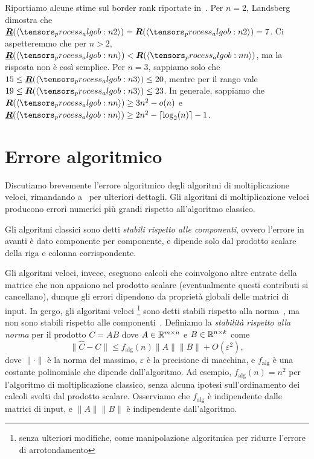 Riportiamo alcune stime sul border rank riportate in~\cite[\S1]{landsberg2015geometry}. Per $ n = 2 $,
Landsberg~\cite{landsberg2006border} dimostra che $ \brk(\algob{2}) = \rk(\algob{2}) = 7 $. Ci aspetteremmo che per $
	n > 2 $, $ \brk(\algob{n}) < \rk(\algob{n}) $, ma la risposta non è così semplice. Per $ n=3 $, sappiamo solo che $ 15 \le
	\brk(\algob{3}) \le 20 $, mentre per il rango vale $ 19 \le \rk(\algob{3}) \le 23 $. In generale, sappiamo che $
	\rk(\algob{n}) \ge  3n^2 - o(n) $ e $ \brk(\algob{n}) \ge 2n^2 - \left\lceil \log_{2}(n)
	\right\rceil -1 $.

\section{Errore algoritmico}
\label{sec:err_algo}

Discutiamo brevemente l'errore algoritmico degli algoritmi di moltiplicazione veloci, rimandando
a~\cite{ballard2016improving} per ulteriori dettagli.
Gli algoritmi di moltiplicazione veloci producono errori numerici più grandi rispetto all'algoritmo
classico.

Gli algoritmi classici sono detti \emph{stabili rispetto alle
	componenti}, ovvero l'errore in avanti è dato componente per componente, e dipende solo dal prodotto scalare
della riga e colonna corrispondente.

Gli algoritmi veloci, invece, eseguono calcoli che coinvolgono
altre entrate della matrice che non appaiono nel prodotto scalare (eventualmente questi contributi
si cancellano), dunque gli errori dipendono da proprietà globali delle matrici di input. In gergo, gli algoritmi veloci
\footnote{senza ulteriori modifiche, come manipolazione algoritmica per ridurre l'errore di
	arrotondamento} sono detti stabili rispetto alla norma~\cite{bini1980stability,
	miller1974computational}, ma non sono stabili rispetto alle componenti~\cite{miller1974computational}. Definiamo la \emph{stabilità rispetto alla norma} per il prodotto $ C = AB $ dove $ A \in \mathbb{R}^{m \times n} $
e $ B \in \mathbb{R}^{n \times k} $ come
\begin{equation*}
	\| \hat{C} - C \| \le f_{\text{alg}}(n) \| A \| \|B\| + O(\varepsilon^2),
\end{equation*}
dove $ \| \cdot \| $ è la norma del massimo, $ \varepsilon $ è la precisione di macchina, e $
	f_{\text{alg}} $ è una costante polinomiale che dipende dall'algoritmo. Ad esempio, $
	f_{\text{alg}}(n) = n^2$ per l'algoritmo di moltiplicazione classico, senza alcuna ipotesi
sull'ordinamento dei calcoli svolti dal prodotto scalare. Osserviamo che $ f_{\text{alg}} $ è
indipendente dalle matrici di input, e $ \|A\|\|B\| $ è indipendente dall'algoritmo.

